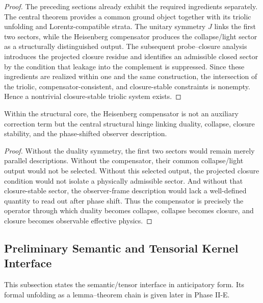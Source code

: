 \begin{proof}
The preceding sections already exhibit the required ingredients separately.
The central theorem provides a common ground object together with its triolic
unfolding and Lorentz-compatible strata. The unitary symmetry $J$ links the
first two sectors, while the Heisenberg compensator produces the
collapse/light sector as a structurally distinguished output. The subsequent
probe--closure analysis introduces the projected closure residue and identifies
an admissible closed sector by the condition that leakage into the complement
is suppressed. Since these ingredients are realized within one and the same
construction, the intersection of the triolic, compensator-consistent, and
closure-stable constraints is nonempty. Hence a nontrivial closure-stable
triolic system exists.
\end{proof}

\begin{proposition}
\label{prop:hc-centrality}
Within the structural core, the Heisenberg compensator is not an auxiliary
correction term but the central structural hinge linking duality, collapse,
closure stability, and the phase-shifted observer description.
\end{proposition}

\begin{proof}
Without the duality symmetry, the first two sectors would remain merely
parallel descriptions. Without the compensator, their common collapse/light
output would not be selected. Without this selected output, the projected
closure condition would not isolate a physically admissible sector. And
without that closure-stable sector, the observer-frame description would lack a
well-defined quantity to read out after phase shift. Thus the compensator is
precisely the operator through which duality becomes collapse, collapse becomes
closure, and closure becomes observable effective physics.
\end{proof}


\subsection*{Preliminary Semantic and Tensorial Kernel Interface}

This subsection states the semantic/tensor interface in anticipatory form. Its formal unfolding as a lemma--theorem chain is given later in Phase II-E.

